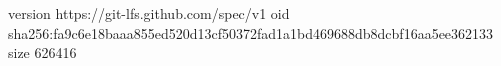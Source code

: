 version https://git-lfs.github.com/spec/v1
oid sha256:fa9c6e18baaa855ed520d13cf50372fad1a1bd469688db8dcbf16aa5ee362133
size 626416
